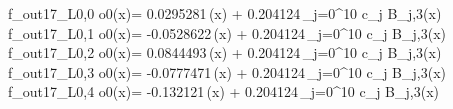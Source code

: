 f_{out17_L0,0	o0}(x)= 0.0295281\,\phi(x) + 0.204124\,\sum_{j=0}^{10} c_j B_{j,3}(x)
f_{out17_L0,1	o0}(x)= -0.0528622\,\phi(x) + 0.204124\,\sum_{j=0}^{10} c_j B_{j,3}(x)
f_{out17_L0,2	o0}(x)= 0.0844493\,\phi(x) + 0.204124\,\sum_{j=0}^{10} c_j B_{j,3}(x)
f_{out17_L0,3	o0}(x)= -0.0777471\,\phi(x) + 0.204124\,\sum_{j=0}^{10} c_j B_{j,3}(x)
f_{out17_L0,4	o0}(x)= -0.132121\,\phi(x) + 0.204124\,\sum_{j=0}^{10} c_j B_{j,3}(x)
